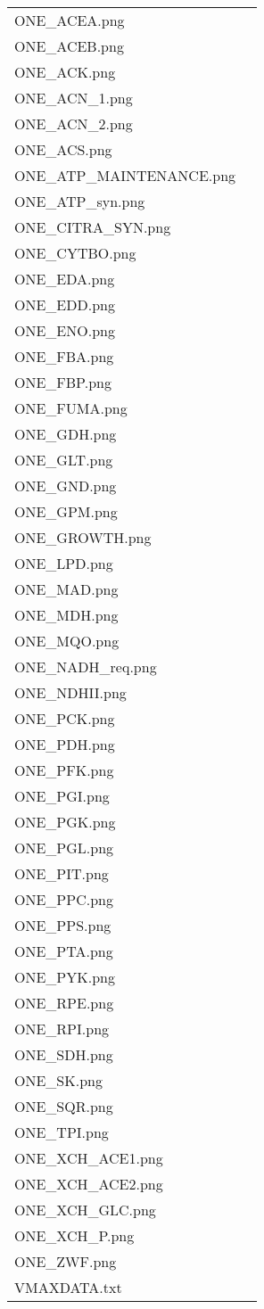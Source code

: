 \documentclass[a4paper, parskip=full]{scrreprt}
\begin{document}
\begin{longtable}{ll}
ONE\_ACEA.png\\
ONE\_ACEB.png\\
ONE\_ACK.png\\
ONE\_ACN\_1.png\\
ONE\_ACN\_2.png\\
ONE\_ACS.png\\
ONE\_ATP\_MAINTENANCE.png\\
ONE\_ATP\_syn.png\\
ONE\_CITRA\_SYN.png\\
ONE\_CYTBO.png\\
ONE\_EDA.png\\
ONE\_EDD.png\\
ONE\_ENO.png\\
ONE\_FBA.png\\
ONE\_FBP.png\\
ONE\_FUMA.png\\
ONE\_GDH.png\\
ONE\_GLT.png\\
ONE\_GND.png\\
ONE\_GPM.png\\
ONE\_GROWTH.png\\
ONE\_LPD.png\\
ONE\_MAD.png\\
ONE\_MDH.png\\
ONE\_MQO.png\\
ONE\_NADH\_req.png\\
ONE\_NDHII.png\\
ONE\_PCK.png\\
ONE\_PDH.png\\
ONE\_PFK.png\\
ONE\_PGI.png\\
ONE\_PGK.png\\
ONE\_PGL.png\\
ONE\_PIT.png\\
ONE\_PPC.png\\
ONE\_PPS.png\\
ONE\_PTA.png\\
ONE\_PYK.png\\
ONE\_RPE.png\\
ONE\_RPI.png\\
ONE\_SDH.png\\
ONE\_SK.png\\
ONE\_SQR.png\\
ONE\_TPI.png\\
ONE\_XCH\_ACE1.png\\
ONE\_XCH\_ACE2.png\\
ONE\_XCH\_GLC.png\\
ONE\_XCH\_P.png\\
ONE\_ZWF.png\\
VMAXDATA.txt
\end{longtable}
\end{document}
